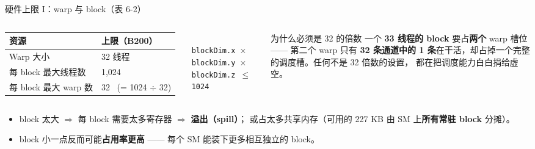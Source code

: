 \documentclass[aspectratio=169]{beamer}
\newcommand{\kw}[1]{\textbf{\textcolor{kwblue}{#1}}}
\begin{document}
\begin{frame}{硬件上限 I：warp 与 block（表 6-2）}
  \begin{columns}[c]
    {\small
    \begin{tabular}{@{}ll@{}}
      \toprule
      \textbf{资源} & \textbf{上限（B200）} \\
      \midrule
      Warp 大小 & 32 线程 \\
      每 block 最大线程数 & 1{,}024 \\
      每 block 最大 warp 数 & 32 \ (= 1024 $\div$ 32) \\
      \bottomrule
    \end{tabular}}\\[6pt]
    {\scriptsize \texttt{blockDim.x $\times$ blockDim.y $\times$ blockDim.z $\leq$ 1024}}
    \begin{block}{为什么必须是 32 的倍数}
      \small 一个 \kw{33 线程的 block} 要占\kw{两个} warp 槽位 —— 第二个 warp 只有
      \kw{32 条通道中的 1 条}在干活，却占掉一个完整的调度槽。任何不是 32 倍数的设置，
      都在把调度能力白白捐给虚空。
    \end{block}
  \end{columns}
  \medskip
  \begin{itemize}
    \item block 太大 $\Rightarrow$ 每 block 需要太多寄存器 $\Rightarrow$ \kw{溢出（spill）}；
          或占太多共享内存（可用的 227 KB 由 SM 上\kw{所有常驻 block} 分摊）。
    \item block 小一点反而可能\kw{占用率更高} —— 每个 SM 能装下更多相互独立的 block。
  \end{itemize}
\end{frame}
\end{document}

